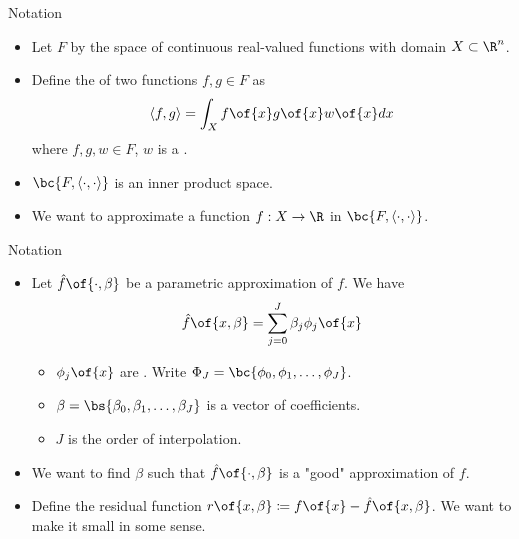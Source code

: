\documentclass[11pt,xcolor={dvipsnames},aspectratio=159,hyperref={pdftex,pdfpagemode=UseNone,hidelinks,pdfdisplaydoctitle=true},usepdftitle=false]{beamer}
\begin{document}
\begin{frame}{Notation}   
    \begin{itemize} 
      \item Let $F$ by the space of continuous real-valued functions with domain $X\subset\R^n$.
      \item Define the  of two functions $f, g \in F$ as 
      \begin{align*}
            \langle f, g \rangle = \int_{X} f\of{x} g\of{x} w\of{x} dx
        \end{align*}
        where $f,g,w \in F$, $w$ is a .
        \item $\bc{F, \langle \cdot, \cdot \rangle}$ is an inner product space.
        \item We want to approximate a  function $f : X \rightarrow \R$ in $\bc{F, \langle \cdot, \cdot \rangle}$.
        
       \end{itemize}
\end{frame}

\begin{frame}{Notation}   
    \begin{itemize} 
      \item Let $\hat{f}\of{\cdot,\beta}$ be a parametric approximation of $f$. We have 
      \begin{align*}
            \hat{f}\of{x,\beta} = \sum_{j=0}^{J} \beta_j \phi_j\of{x}
      \end{align*}
        
        \begin{itemize}
                \item $\phi_j\of{x}$ are . Write $\Phi_J = \bc{\phi_0, \phi_1, \ldots, \phi_{J}}$.
                \item $\beta = \bs{\beta_0,\beta_1,\ldots,\beta_{J}}$ is a vector of coefficients.
                \item $J$ is the order of interpolation.
            \end{itemize}    
      \item We want to find $\beta$ such that $\hat{f}\of{\cdot,\beta}$ is a "good" approximation of $f$.
      \item Define the residual function  $r\of{x,\beta} \coloneqq f\of{x} - \hat{f}\of{x,\beta}$. We want to make it small in some sense.
        \end{itemize}
      
\end{frame}
\end{document}
